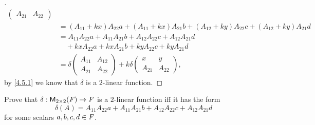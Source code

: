 \begin{proof}[]
\begin{align*}
\begin{pmatrix}
			         A_{2 1}      & A_{2 2}
		         \end{pmatrix}                                                                           \\
		 & = (A_{1 1} + kx) A_{2 2} a + (A_{1 1} + kx) A_{2 1} b + (A_{1 2} + ky) A_{2 2} c + (A_{1 2} + ky) A_{2 1} d \\
		 & = A_{1 1} A_{2 2} a + A_{1 1} A_{2 1} b + A_{1 2} A_{2 2} c + A_{1 2} A_{2 1} d                             \\
		 & \quad + kx A_{2 2} a + kx A_{2 1} b + ky A_{2 2} c + ky A_{2 1} d                                           \\
		 & = \delta\begin{pmatrix}
			           A_{1 1} & A_{1 2} \\
			           A_{2 1} & A_{2 2}
		           \end{pmatrix} + k \delta\begin{pmatrix}
			                                   x       & y       \\
			                                   A_{2 1} & A_{2 2}
		                                   \end{pmatrix},
	\end{align*}
	by \cref{4.5.1} we know that \(\delta\) is a \(2\)-linear function.
\end{proof}

\begin{ex}\label{ex:4.5.15}
	Prove that \(\delta : \mathsf{M}_{{2} \times 2}({\mathit{F}}) \to \mathit{F}\) is a \(2\)-linear function iff it has the form
	\[
		\delta(A) = A_{1 1} A_{2 2} a + A_{1 1} A_{2 1} b + A_{1 2} A_{2 2} c + A_{1 2} A_{2 1} d
	\]
	for some scalars \(a, b, c, d \in \mathit{F}\).
\end{ex}

